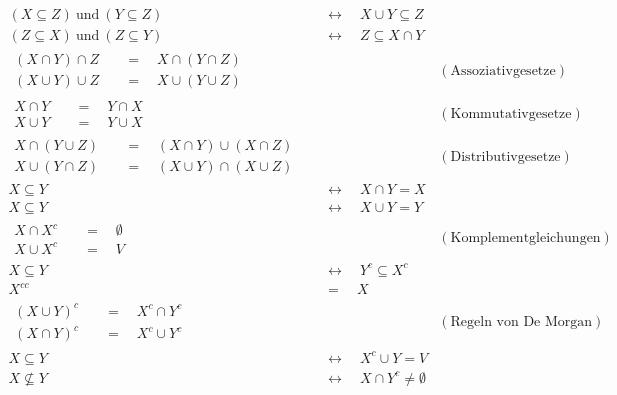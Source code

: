\begin{align*}
    (X\subseteq Z) \ \text{und}\ (Y\subseteq Z)  & \quad \leftrightarrow\quad X\cup Y \subseteq Z  \\
    (Z\subseteq X) \ \text{und}\ (Z\subseteq Y) & \quad \leftrightarrow\quad Z \subseteq X\cap Y  \\[1em]
    \begin{split}
        (X \cap Y) \cap Z &  \quad = \quad  X \cap (Y \cap Z) \\
        (X \cup Y) \cup Z &  \quad = \quad  X \cup (Y \cup Z)
    \end{split} && (\text{Assoziativgesetze}) \\[1em]
    \begin{split}
        X \cap Y &  \quad = \quad  Y\cap X \\
        X \cup Y &  \quad = \quad  Y\cup X
    \end{split} && ( \text{Kommutativgesetze}) \\[1em]
    \begin{split}
        X \cap (Y \cup Z) &  \quad = \quad  (X\cap Y) \cup (X\cap Z) \\
        X \cup (Y\cap Z) &  \quad = \quad  (X\cup Y) \cap (X\cup Z)
    \end{split} && ( \text{Distributivgesetze}) \\[1em]
    X \subseteq Y & \quad \leftrightarrow\quad X\cap Y  =  X \\
    X \subseteq Y & \quad \leftrightarrow\quad X\cup Y = Y \\[1em]
    \begin{split}
        X \cap X^c & \quad = \quad  \emptyset \\
        X \cup X^c & \quad = \quad  V
    \end{split} && (\text{Komplementgleichungen}) \\[1em]
    X \subseteq Y & \quad \leftrightarrow\quad Y^c \subseteq X^c \\
    X^{cc} &  \quad = \quad  X \\[1em]
    \begin{split}
        (X\cup Y)^c &  \quad = \quad  X^c \cap Y^c \\
        (X\cap Y)^c &  \quad = \quad X^c \cup Y^c
    \end{split} && (\text{Regeln von De Morgan}) \\[1em]
    X \subseteq Y & \quad \leftrightarrow\quad X^c \cup Y = V \\
    X \nsubseteq Y & \quad \leftrightarrow\quad X\cap Y^c \neq \emptyset \\[1em]

\end{align*}
